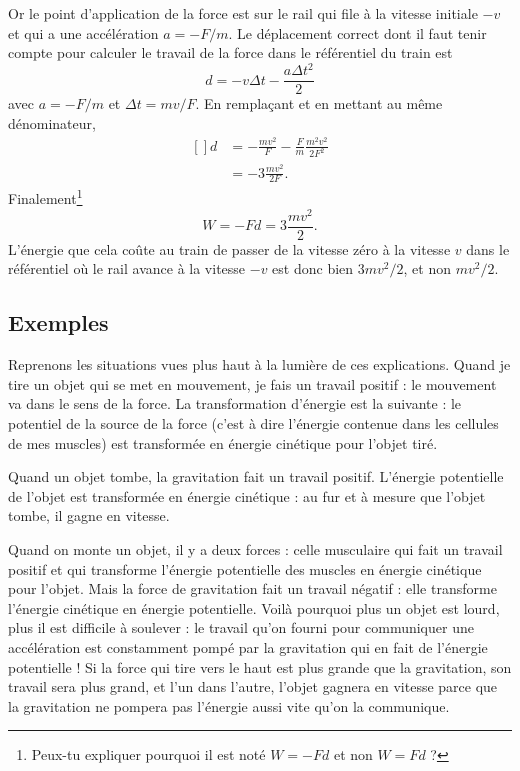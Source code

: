 Or le point d'application de la force est sur le rail qui file à la vitesse initiale $-v$ et qui a une accélération $a=-F/m$. Le déplacement correct dont il faut tenir compte pour calculer le travail de la force dans le référentiel du train est
\begin{equation}
	d=-v\Delta t-\frac{ a\Delta t^2 }{ 2 }
\end{equation}
avec $a=-F/m$ et $\Delta t=mv/F$. En remplaçant et en mettant au même dénominateur,
\begin{equation}
	\begin{aligned}[]
		d&=-\frac{ mv^2 }{ F }-\frac{ F }{ m }\frac{ m^2v^2 }{ 2F^2 }\\
		&=-3\frac{ mv^2 }{ 2F }.
	\end{aligned}
\end{equation}
Finalement\footnote{Peux-tu expliquer pourquoi il est noté $W=-Fd$ et non $W=Fd$ ?}
\begin{equation}
	W=-Fd=3\frac{ mv^2 }{ 2 }.
\end{equation}
L'énergie que cela coûte au train de passer de la vitesse zéro à la vitesse $v$ dans le référentiel où le rail avance à la vitesse $-v$ est donc bien $3mv^2/2$, et non $mv^2/2$.

\subsection{Exemples}

Reprenons les situations vues plus haut à la lumière de ces explications. Quand je tire un objet qui se met en mouvement, je fais un travail positif : le mouvement va dans le sens de la force. La transformation d'énergie est la suivante : le potentiel de la source de la force (c'est à dire l'énergie contenue dans les cellules de mes muscles) est transformée en énergie cinétique pour l'objet tiré.

Quand un objet tombe, la gravitation fait un travail positif. L'énergie potentielle de l'objet est transformée en énergie cinétique : au fur et à mesure que l'objet tombe, il gagne en vitesse.

Quand on monte un objet, il y a deux forces : celle musculaire qui fait un travail positif et qui transforme l'énergie potentielle des muscles en énergie cinétique pour l'objet. Mais la force de gravitation fait un travail négatif : elle transforme l'énergie cinétique en énergie potentielle. Voilà pourquoi plus un objet est lourd, plus il est difficile à soulever : le travail qu'on fourni pour communiquer une accélération est constamment pompé par la gravitation qui en fait de l'énergie potentielle ! Si la force qui tire vers le haut est plus grande que la gravitation, son travail sera plus grand, et l'un dans l'autre, l'objet gagnera en vitesse parce que la gravitation ne pompera pas l'énergie aussi vite qu'on la communique.

